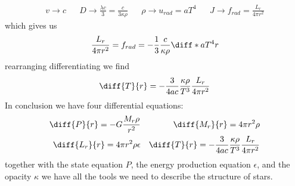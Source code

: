 \begin{align}
	v \rightarrow c && D \rightarrow \frac{\lambda c}{3} = \frac{c}{3\kappa\rho} && \rho \rightarrow u_{rad} = aT^4 && J \rightarrow f_{rad} = \frac{L_r}{4\pi r^2}
\end{align}
which gives us
\begin{equation}
	\frac{L_r}{4\pi r^2} = f_{rad} = -\frac{1}{3}\frac{c}{\kappa\rho}\diff*{aT^4}{r}
\end{equation}
rearranging differentiating we find
\begin{equation}
	\diff{T}{r} = -\frac{3}{4ac}\frac{\kappa\rho}{T^3}\frac{L_r}{4\pi r^2}
\end{equation}
In conclusion we have four differential equations:
\begin{align}
	\diff{P}{r} = -G\frac{M_r\rho}{r^2} && \diff{M_r}{r} = 4\pi r^2\rho \\
	\diff{L_r}{r} = 4\pi r^2\rho\epsilon && \diff{T}{r} = -\frac{3}{4ac}\frac{\kappa\rho}{T^3}\frac{L_r}{4\pi r^2}
\end{align}
together with the state equation \(P\), the energy production equation \(\epsilon \), and the opacity \(\kappa \) we have all the tools we need to describe the structure of stars.